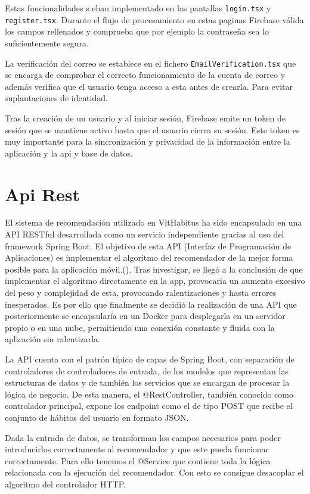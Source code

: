 Estas funcionalidades s ehan implementado en las pantallas \texttt{login.tsx} y \texttt{register.tsx}. Durante el flujo de procesamiento en estas paginas Firebase válida los campos rellenados y comprueba que por ejemplo la contraseña sea lo suficientemente segura. 

La verificación del correo se establece en el fichero \texttt{EmailVerification.tsx} que se encarga de comprobar el correcto funcionamiento de la cuenta de correo y además verifica que el usuario tenga acceso a esta antes de crearla. Para evitar suplantaciones de identidad.

Tras la creación de un usuario y al iniciar sesión, Firebase emite un token de sesión que se mantiene activo hasta que el usuario cierra su sesión. Este token es muy importante para la sincronización y privacidad de la información entre la aplicación y la api y base de datos.


\section{Api Rest}

El sistema de recomendación utilizado en VitHabitus ha sido encapsulado en una API RESTful desarrollada como un servicio independiente gracias al uso del framework Spring Boot. El objetivo de esta API (Interfaz de Programación de Aplicaciones) es implementar el algoritmo del recomendador de la mejor forma posible para la aplicación móvil.(\cite{sts_rest}).
Tras investigar, se llegó a la conclusión de que implementar el algoritmo directamente en la app, provocaria un aumento excesivo del peso y complejidad de esta, provocando ralentizaciones y hasta errores inesperados. Es por ello que finalmente se decidió la realización de una API que posteriormente se encapsularía en un Docker para desplegarla en un servidor propio o en una nube, permitiendo una conexión constante y fluida con la aplicación sin ralentizarla.

La API cuenta con el patrón típico de capas de Spring Boot, con separación de controladores de controladores de entrada, de los modelos que representan las estructuras de datos y de también los servicios que se encargan de procesar la lógica de negocio. De esta manera, el @RestController, también conocido como controlador principal, expone los endpoint como el de tipo POST que recibe el conjunto de hábitos del usuario en formato JSON.

Dada la entrada de datos, se transforman los campos necesarios para poder introducirlos correctamente al recomendador y que este pueda funcionar correctamente. Para ello tenemos el @Service que contiene toda la lógica relacionada con la ejecución del recomendador. Con esto se consigue desacoplar el algoritmo del controlador HTTP.

